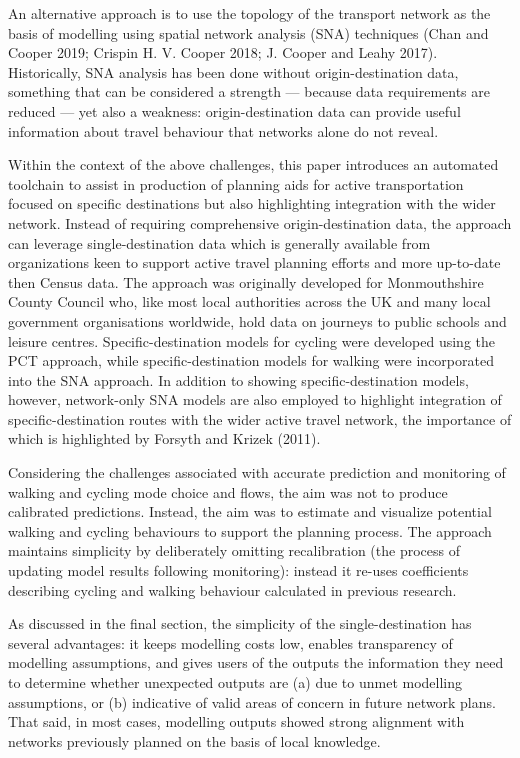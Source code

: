 \documentclass[galley]{jtlu-article-2col}
\begin{document}
An alternative approach is to use the topology of the transport network as the basis of modelling using spatial network analysis (SNA) techniques (Chan and Cooper 2019; Crispin H. V. Cooper 2018; J. Cooper and Leahy 2017).
Historically, SNA analysis has been done without origin-destination data, something that can be considered a strength --- because data requirements are reduced --- yet also a weakness: origin-destination data can provide useful information about travel behaviour that networks alone do not reveal.

Within the context of the above challenges, this paper introduces an automated toolchain to assist in production of planning aids for active transportation focused on specific destinations but also highlighting integration with the wider network.
Instead of requiring comprehensive origin-destination data, the approach can leverage single-destination data which is generally available from organizations keen to support active travel planning efforts and more up-to-date then Census data.
The approach was originally developed for Monmouthshire County Council who, like most local authorities across the UK and many local government organisations worldwide, hold data on journeys to public schools and leisure centres. Specific-destination models for cycling were developed using the PCT approach, while specific-destination models for walking were incorporated into the SNA approach.
In addition to showing specific-destination models, however, network-only SNA models are also employed to highlight integration of specific-destination routes with the wider active travel network, the importance of which is highlighted by Forsyth and Krizek (2011).

Considering the challenges associated with accurate prediction and monitoring of walking and cycling mode choice and flows, the aim was not to produce calibrated predictions.
Instead, the aim was to estimate and visualize potential walking and cycling behaviours to support the planning process.
The approach maintains simplicity by deliberately omitting recalibration (the process of updating model results following monitoring): instead it re-uses coefficients describing cycling and walking behaviour calculated in previous research.

As discussed in the final section, the simplicity of the single-destination has several advantages: it keeps modelling costs low, enables transparency of modelling assumptions, and gives users of the outputs the information they need to determine whether unexpected outputs are (a) due to unmet modelling assumptions, or (b) indicative of valid areas of concern in future network plans.
That said, in most cases, modelling outputs showed strong alignment with networks previously planned on the basis of local knowledge.
\end{document}
